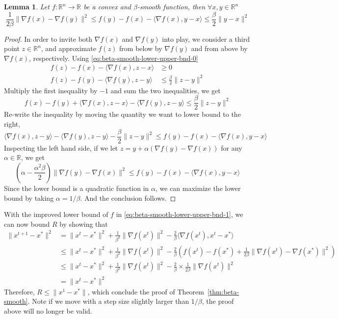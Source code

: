 \documentclass{scrartcl}
\newtheorem{lemma}{Lemma}
\newcommand{\RR}{\mathbb{R}}
\begin{document}
\begin{lemma}
  Let $f:\RR^n\rightarrow\RR$ be a convex and $\beta$-smooth function, then $\forall x,y\in\RR^n$
  \begin{equation}
  \frac{1}{2\beta}\|\nabla f(x)-\nabla f(y)\|^2
  \leq f(y) - f(x) - \langle \nabla f(x), y-x\rangle
  \leq \frac {\beta} {2}\|y-x\|^2
  \label{eq:beta-smooth-lower-upper-bnd-1}
  \end{equation}
\end{lemma}
\begin{proof}
  In order to invite both $\nabla f(x)$ and $\nabla f(y)$ into play, we consider a third point
  $z\in\RR^n$, and approximate $f(z)$ from below by $\nabla f(y)$ and from above by $\nabla f(x)$,
  respectively. Using \eqref{eq:beta-smooth-lower-upper-bnd-0}
  \[
  \begin{aligned}
    f(z) - f(x) - \langle \nabla f(x), z-x\rangle &\geq 0\\
    f(z) - f(y) - \langle \nabla f(y), z-y\rangle &\leq \frac{\beta}{2}\|z-y\|^2
  \end{aligned}
  \]
  Multiply the first inequality by $-1$ and sum the two inequalities, we get
  \[
  f(x)-f(y)+\langle \nabla f(x), z-x\rangle - \langle \nabla f(y),z-y\rangle \leq \frac{\beta}
  {2}\|z-y\|^2
  \]
  Re-write the inequality by moving the quantity we want to lower bound to the right,
  \[
   \langle \nabla f(x), z-y\rangle - \langle \nabla f(y),z-y\rangle - \frac{\beta}{2}\|z-y\|^2\leq f
   (y)-f (x)-\langle \nabla f (x),y-x\rangle
  \]
  Inspecting the left hand side, if we let $z=y+\alpha (\nabla f(y)-\nabla f(x))$ for any
  $\alpha\in\RR$, we get
  \[
  \left(\alpha - \frac{\alpha^2\beta}{2}\right)\|\nabla f(y)-\nabla f(x)\|^2\leq f (y)-f (x)-\langle
  \nabla f
  (x),y-x\rangle
  \]
  Since the lower bound is a quadratic function in $\alpha$, we can maximize the lower bound by
  taking $\alpha = 1/\beta$. And the conclusion follows.
\end{proof}

With the improved lower bound of $f$ in \eqref{eq:beta-smooth-lower-upper-bnd-1}, we can now bound
$R$ by showing that
\[
  \begin{aligned}
    \|x^{t+1}-x^*\|^2
    &=\|x^t-x^*\|^2 + \frac{1}{\beta^2}\|\nabla f(x^t)\|^2 - \frac{2}{\beta}\langle \nabla f(x^t),
    x^t-x^*\rangle \\
    &\leq \|x^t-x^*\|^2 + \frac{1}{\beta^2}\|\nabla f(x^t)\|^2
    - \frac{2}{\beta}\left(f(x^t)-f(x^*) + \frac{1}{2\beta}\|\nabla f(x^t)-\nabla f(x^*)\|^2\right)
    \\
    &\leq \|x^t-x^*\|^2 + \frac{1}{\beta^2}\|\nabla f(x^t)\|^2 - \frac{2}{\beta}\times \frac{1}
    {2\beta}\|\nabla f(x^t)\|^2 \\
    & = \|x^t-x^*\|^2
  \end{aligned}
\]
Therefore, $R\leq \|x^1-x^*\|$, which conclude the proof of Theorem~\ref{thm:beta-smooth}. Note if
we move with a step size slightly larger than $1/\beta$, the proof above will no longer be valid.

%
%
\end{document}
